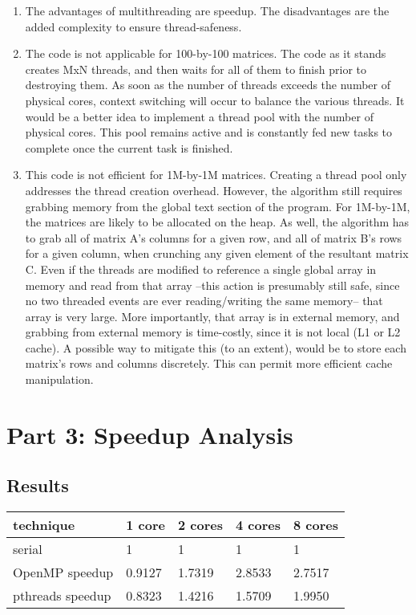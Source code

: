 \documentclass[conference]{IEEEtran}
\begin{document}
\begin{enumerate}
\item
The advantages of multithreading are speedup. The disadvantages are the added 
complexity to ensure thread-safeness.
\item
The code is not applicable for 100-by-100 matrices. The code as it stands 
creates MxN threads, and then waits for all of them to finish prior to 
destroying them. As soon as the number of threads exceeds the number of 
physical cores, context switching will occur to balance the various threads. 
It would be a better idea to implement a thread pool with the number of 
physical cores. This pool remains active and is constantly fed new tasks to 
complete once the current task is finished.
\item
This code is not efficient for 1M-by-1M matrices. Creating a thread pool only 
addresses the thread creation overhead. However, the algorithm still requires 
grabbing memory from the global text section of the program. For 1M-by-1M, the 
matrices are likely to be allocated on the heap. As well, the algorithm has to 
grab all of matrix A's columns for a given row, and all of matrix B's rows for 
a given column, when crunching any given element of the resultant matrix C. 
Even if the threads are modified to reference a single global array in memory 
and read from that array --this action is presumably still safe, since no 
two threaded events are ever reading/writing the same memory-- that array 
is very large. More importantly, that array is in external memory, and 
grabbing from external memory is time-costly, since it is not local (L1 or L2 
cache). A possible way to mitigate this (to an extent), would be to store each 
matrix's rows and columns discretely. This can permit more efficient cache 
manipulation.
\end{enumerate}

\section{Part 3: Speedup Analysis}

\subsection{Results}

\begin{table}[h]
\begin{tabular}{|l|l|l|l|l|}
\hline
technique & 1 core & 2 cores & 4 cores & 8 cores \\ \hline
serial & 1 & 1 & 1 & 1 \\ \hline
OpenMP speedup & 0.9127 & 1.7319 & 2.8533 & 2.7517 \\ \hline
pthreads speedup & 0.8323 & 1.4216 & 1.5709 & 1.9950 \\ \hline
\end{tabular}
\end{table}
\end{document}
